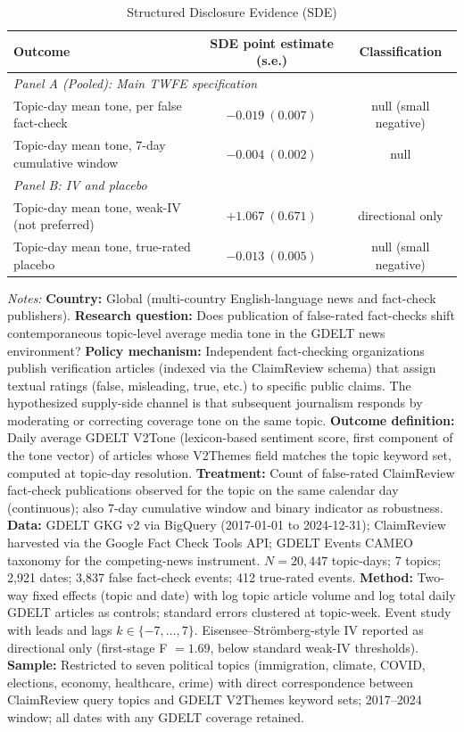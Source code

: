 \begin{table}[htbp]\centering
\caption{Structured Disclosure Evidence (SDE)}\label{tab:sde}
\footnotesize
\begin{tabular}{lcc}\toprule
Outcome & SDE point estimate (s.e.) & Classification \\
\midrule
\multicolumn{3}{l}{\textit{Panel A (Pooled): Main TWFE specification}} \\
Topic-day mean tone, per false fact-check       & $-0.019\ (0.007)$ & null (small negative) \\
Topic-day mean tone, 7-day cumulative window    & $-0.004\ (0.002)$ & null \\
\midrule
\multicolumn{3}{l}{\textit{Panel B: IV and placebo}} \\
Topic-day mean tone, weak-IV (not preferred)    & $+1.067\ (0.671)$ & directional only \\
Topic-day mean tone, true-rated placebo          & $-0.013\ (0.005)$ & null (small negative) \\
\bottomrule
\end{tabular}

\vspace{0.5em}
\begin{minipage}{0.95\textwidth}
\footnotesize
\emph{Notes:}
\textbf{Country:} Global (multi-country English-language news and fact-check publishers).
\textbf{Research question:} Does publication of false-rated fact-checks shift contemporaneous topic-level average media tone in the GDELT news environment?
\textbf{Policy mechanism:} Independent fact-checking organizations publish verification articles (indexed via the ClaimReview schema) that assign textual ratings (false, misleading, true, etc.) to specific public claims. The hypothesized supply-side channel is that subsequent journalism responds by moderating or correcting coverage tone on the same topic.
\textbf{Outcome definition:} Daily average GDELT V2Tone (lexicon-based sentiment score, first component of the tone vector) of articles whose V2Themes field matches the topic keyword set, computed at topic-day resolution.
\textbf{Treatment:} Count of false-rated ClaimReview fact-check publications observed for the topic on the same calendar day (continuous); also 7-day cumulative window and binary indicator as robustness.
\textbf{Data:} GDELT GKG v2 via BigQuery (2017-01-01 to 2024-12-31); ClaimReview harvested via the Google Fact Check Tools API; GDELT Events CAMEO taxonomy for the competing-news instrument. $N = 20{,}447$ topic-days; 7 topics; 2{,}921 dates; 3{,}837 false fact-check events; 412 true-rated events.
\textbf{Method:} Two-way fixed effects (topic and date) with log topic article volume and log total daily GDELT articles as controls; standard errors clustered at topic-week. Event study with leads and lags $k \in \{-7,\dots,7\}$. Eisensee--Str\"omberg-style IV reported as directional only (first-stage F $=1.69$, below standard weak-IV thresholds).
\textbf{Sample:} Restricted to seven political topics (immigration, climate, COVID, elections, economy, healthcare, crime) with direct correspondence between ClaimReview query topics and GDELT V2Themes keyword sets; 2017--2024 window; all dates with any GDELT coverage retained.


\end{minipage}
\end{table}
